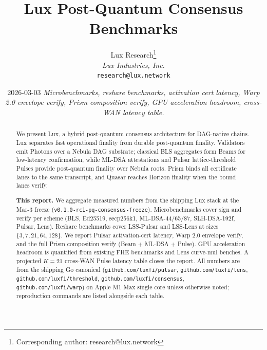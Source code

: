 \documentclass[11pt,a4paper]{article}
\title{Lux Post-Quantum Consensus Benchmarks}
\author{
Lux Research\thanks{Corresponding author: research@lux.network}\\
\textit{Lux Industries, Inc.}\\
\texttt{research@lux.network}
}
\date{2026-03-03 \quad\textit{Microbenchmarks, reshare benchmarks, activation cert latency, Warp 2.0 envelope verify, Prism composition verify, GPU acceleration headroom, cross-WAN latency table.}}
\begin{document}
\luxcoverpage

\begin{abstract}
\noindent We present Lux, a hybrid post-quantum consensus architecture for DAG-native chains. Lux separates fast operational finality from durable post-quantum finality. Validators emit Photons over a Nebula DAG substrate; classical BLS aggregates form Beams for low-latency confirmation, while ML-DSA attestations and Pulsar lattice-threshold Pulses provide post-quantum finality over Nebula roots. Prism binds all certificate lanes to the same transcript, and Quasar reaches Horizon finality when the bound lanes verify.

\textbf{This report.} We aggregate measured numbers from the shipping Lux stack at the Mar-3 freeze (\texttt{v0.1.0-rc1-pq-consensus-freeze}). Microbenchmarks cover sign and verify per scheme (BLS, Ed25519, secp256k1, ML-DSA-44/65/87, SLH-DSA-192f, Pulsar, Lens). Reshare benchmarks cover LSS-Pulsar and LSS-Lens at sizes $\{3, 7, 21, 64, 128\}$. We report Pulsar activation-cert latency, Warp 2.0 envelope verify, and the full Prism composition verify (Beam + ML-DSA + Pulse). GPU acceleration headroom is quantified from existing FHE benchmarks \cite{luxfhebenchmarks} and Lens curve-mul benches. A projected $K=21$ cross-WAN Pulse latency table closes the report. All numbers are from the shipping Go canonical (\texttt{github.com/luxfi/pulsar}, \texttt{github.com/luxfi/lens}, \texttt{github.com/luxfi/threshold}, \texttt{github.com/luxfi/consensus}, \texttt{github.com/luxfi/warp}) on Apple M1 Max single core unless otherwise noted; reproduction commands are listed alongside each table.
\end{abstract}

\tableofcontents
\newpage














\end{document}
